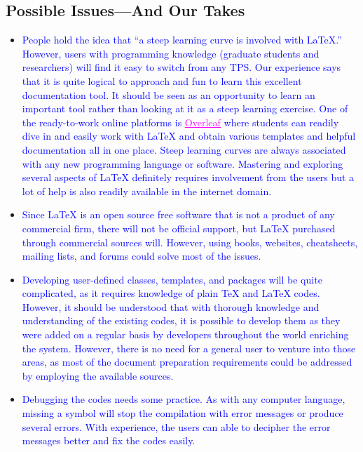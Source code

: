 \documentclass[phd]{ndsu-thesis-2022}
\newcommand\italk[1]{\textcolor{blue}{#1}}  %
\newcommand\lx{\LaTeX\xspace}
\newcommand\tx{\TeX\xspace}
\begin{document}
\subsection{Possible Issues---And Our Takes}
\begin{itemize}[leftmargin=*, itemsep=0pt, parsep=3pt] 
\item \italk{People hold the idea that ``a steep learning curve is involved with \lx.'' However, users with programming knowledge (graduate students and researchers) will find it easy to switch from any TPS. Our experience says that it is quite logical to approach and fun to learn this excellent documentation tool. It should be seen as an opportunity to learn an important tool rather than looking at it as a steep learning exercise. One of the ready-to-work online platforms is \href{https://www.overleaf.com/login}{\textcolor{magenta}{\underline{Overleaf}}} where students can readily dive in and easily work with \lx and obtain various templates and helpful documentation all in one place. Steep learning curves are always associated with any new programming language or software. Mastering and exploring several aspects of \lx definitely requires involvement from the users but a lot of help is also readily available in the internet domain.}   

\item \italk{Since \lx is an open source free software that is not a product of any commercial firm, there will not be official support, but \lx purchased through commercial sources will. However, using books, websites, cheatsheets, mailing lists, and forums could solve most of the issues.} 

\item \italk{Developing user-defined classes, templates, and packages will be quite complicated, as it requires knowledge of plain \tx and \lx codes. However, it should be understood that with thorough knowledge and understanding of the existing codes, it is possible to develop them as they were added on a regular basis by developers throughout the world enriching the system. However, there is no need for a general user to venture into those areas, as most of the document preparation requirements could be addressed by employing the available sources.} 

\item \italk{Debugging the codes needs some practice. As with any computer language, missing a symbol will stop the compilation with error messages or produce several errors. With experience, the users can able to decipher the error messages better and fix the codes easily.}  


\end{itemize}
\end{document}
